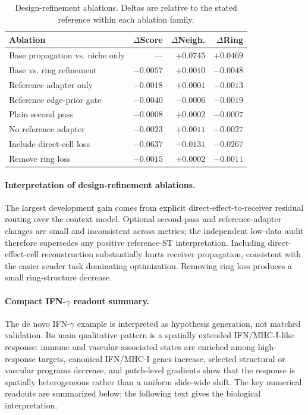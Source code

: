 \documentclass[sigconf,review,balance=false]{acmart}
\begin{document}
\begin{table}[t]
\centering
\caption{Design-refinement ablations. Deltas are relative to the stated reference within each ablation family.}
\label{tab:app_design_refinement_ablations}
\small
\setlength{\tabcolsep}{1.6pt}
\renewcommand{\arraystretch}{1.05}
\begin{tabularx}{\linewidth}{@{}>{\raggedright\arraybackslash}Xrrr@{}}
\toprule
Ablation & $\Delta$Score & $\Delta$Neigh. & $\Delta$Ring \\
\midrule
Base propagation vs. niche only & --- & $+0.0745$ & $+0.0469$ \\
Base vs. ring refinement        & $-0.0057$ & $+0.0010$ & $-0.0048$ \\
Reference adapter only          & $-0.0018$ & $+0.0001$ & $-0.0013$ \\
Reference edge-prior gate       & $-0.0040$ & $-0.0006$ & $-0.0019$ \\
Plain second pass               & $-0.0008$ & $+0.0002$ & $-0.0007$ \\
No reference adapter            & $-0.0023$ & $+0.0011$ & $-0.0027$ \\
Include direct-cell loss        & $-0.0637$ & $-0.0131$ & $-0.0267$ \\
Remove ring loss                & $-0.0015$ & $+0.0002$ & $-0.0011$ \\
\bottomrule
\end{tabularx}
\end{table}





\paragraph{Interpretation of design-refinement ablations.}
The largest development gain comes from explicit
direct-effect-to-receiver residual routing over the context model. Optional
second-pass and reference-adapter changes are small and inconsistent across
metrics; the independent low-data audit therefore supersedes any positive
reference-ST interpretation. Including direct-effect-cell reconstruction
substantially hurts receiver propagation, consistent with the easier sender
task dominating optimization. Removing ring loss produces a small
ring-structure decrease.

\paragraph{Compact IFN-\texorpdfstring{$\gamma$}{gamma} readout summary.}
The de novo IFN-$\gamma$ example is interpreted as hypothesis generation, not matched validation. Its main qualitative pattern is a spatially extended IFN/MHC-I-like response: immune and vascular-associated states are enriched among high-response targets, canonical IFN/MHC-I genes increase, selected structural or vascular programs decrease, and patch-level gradients show that the response is spatially heterogeneous rather than a uniform slide-wide shift. The key numerical readouts are summarized below; the following text gives the biological interpretation.
\end{document}
